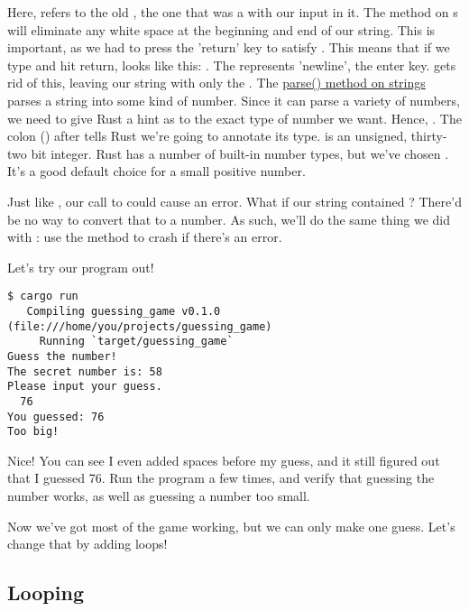 Here,  refers to the old , the one that was a  with our input in it. The  method 
on s will eliminate any white space at the beginning and end of our string. This is important, as we had to press the
'return' key to satisfy . This means that if we type  and hit return,  looks like this: 
. The \code{\\n} represents 'newline', the enter key.  gets rid of this, leaving our string with only the 
. The \href{https://doc.rust-lang.org/std/primitive.str.html#method.parse}{parse() method on strings} parses a string into
some kind of number. Since it can parse a variety of numbers, we need to give Rust a hint as to the exact type of number we want.
Hence, . The colon (\code{:}) after  tells Rust we're going to annotate its type.  is 
an unsigned, thirty-two bit integer. Rust has a number of built-in number types, but we've chosen . It's a good default
choice for a small positive number.

\blank

Just like , our call to  could cause an error. What if our string contained ? 
There'd be no way to convert that to a number. As such, we'll do the same thing we did with : use the 
 method to crash if there's an error.

\blank

Let's try our program out!

\begin{verbatim}
$ cargo run
   Compiling guessing_game v0.1.0 (file:///home/you/projects/guessing_game)
     Running `target/guessing_game`
Guess the number!
The secret number is: 58
Please input your guess.
  76
You guessed: 76
Too big!
\end{verbatim}

Nice! You can see I even added spaces before my guess, and it still figured out that I guessed 76. Run the program a few times, 
and verify that guessing the number works, as well as guessing a number too small.

\blank

Now we've got most of the game working, but we can only make one guess. Let's change that by adding loops!

\subsection{Looping}

